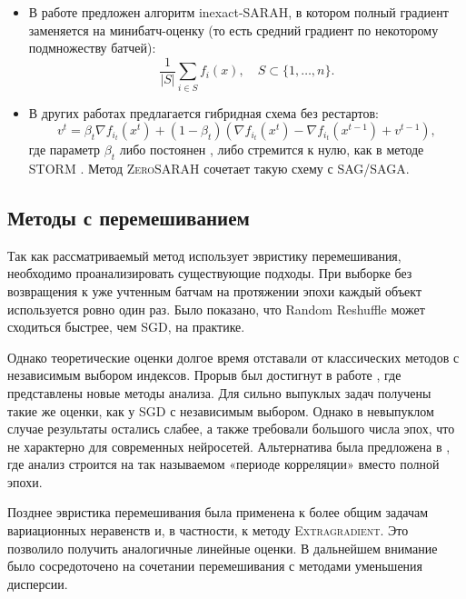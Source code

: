 \begin{itemize}
    \item В работе \citep{nguyen2021inexact} предложен алгоритм inexact-\textsc{SARAH}, в котором полный градиент заменяется на минибатч-оценку (то есть средний градиент по некоторому подмножеству батчей):
    \[
    \frac{1}{|S|} \sum_{i \in S} f_i(x), \quad S \subset \{1, \ldots, n\}.
    \]
    \item В других работах предлагается гибридная схема без рестартов:
    \[
    v^t = \beta_t \nabla f_{i_t}(x^t) + (1 - \beta_t)(\nabla f_{i_t}(x^t) - \nabla f_{i_t}(x^{t-1}) + v^{t-1}),
    \]
    где параметр \(\beta_t\) либо постоянен \citep{liu2020optimal}, либо стремится к нулю, как в методе \textsc{STORM} \citep{cutkosky2019momentum}. Метод \textsc{ZeroSARAH} \citep{li2021zerosarah} сочетает такую схему с \textsc{SAG/SAGA}.
\end{itemize}

\subsection*{Методы с перемешиванием}

Так как рассматриваемый метод использует эвристику перемешивания, необходимо проанализировать существующие подходы. При выборке без возвращения к уже учтенным батчам на протяжении эпохи каждый объект используется ровно один раз. Было показано, что Random Reshuffle может сходиться быстрее, чем \textsc{SGD}, на практике.

Однако теоретические оценки долгое время отставали от классических методов с независимым выбором индексов. Прорыв был достигнут в работе \citep{mishchenko2020random}, где представлены новые методы анализа. Для сильно выпуклых задач получены такие же оценки, как у \textsc{SGD} с независимым выбором. Однако в невыпуклом случае результаты остались слабее, а также требовали большого числа эпох, что не характерно для современных нейросетей. Альтернатива была предложена в \citep{koloskova2024convergence}, где анализ строится на так называемом «периоде корреляции» вместо полной эпохи.

Позднее эвристика перемешивания была применена к более общим задачам вариационных неравенств и, в частности, к методу \textsc{Extragradient}. Это позволило получить аналогичные линейные оценки. В дальнейшем внимание было сосредоточено на сочетании перемешивания с методами уменьшения дисперсии.


